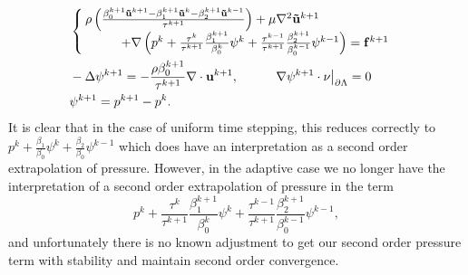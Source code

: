 \documentclass[letterpaper]{erdc}
\begin{document}
\begin{align}
  &\begin{cases}\rho\left(\frac{\beta_0^{k+1}\mathbf{\tilde{u}}^{k+1} - \beta_1^{k+1}\mathbf{\tilde{u}}^{k} - \beta_2^{k+1}\mathbf{\tilde{u}}^{k-1}}{\tau^{k+1}} \right) + \mu\nabla^2 \mathbf{\tilde{u}}^{k+1} \\
    \hspace{1cm}+ \nabla\left( p^{k} + \frac{\tau^{k}}{\tau^{k+1}}\frac{\beta_1^{k+1}}{\beta_0^{k}}\psi^{k} + \frac{\tau^{k-1}}{\tau^{k+1}}\frac{\beta_2^{k+1}}{\beta_0^{k-1}}\psi^{k-1} \right) = \mathbf{f}^{k+1} \end{cases}\label{eq:newadaptivevelocitybdf2}\\
  &-\Delta \psi^{k+1} = -\frac{\rho\beta_0^{k+1}}{\tau^{k+1}}\nabla\cdot\textbf{u}^{k+1}, \hspace{1cm} \left.\nabla\psi^{k+1}\cdot\nu\right|_{\partial\Lambda} = 0 \label{eq:newadaptivepressurecorrectionbdf2}\\
  & \psi^{k+1} = p^{k+1} - p^{k}.
\end{align}
It is clear that in the case of uniform time stepping, this reduces correctly
to $p^{k} + \frac{\beta_1}{\beta_0}\psi^k + \frac{\beta_2}{\beta_0}\psi^{k-1}$
which does have an interpretation as a second order extrapolation of pressure.
However, in the adaptive case we no longer have the interpretation of a second
order extrapolation of pressure in the term
\begin{equation}
  p^{k} + \frac{\tau^{k}}{\tau^{k+1}}\frac{\beta_1^{k+1}}{\beta_0^{k}}\psi^{k} + \frac{\tau^{k-1}}{\tau^{k+1}}\frac{\beta_2^{k+1}}{\beta_0^{k-1}}\psi^{k-1},
\end{equation}
and unfortunately there is no known adjustment to get our second order pressure
term with stability and maintain second order convergence.
\end{document}
